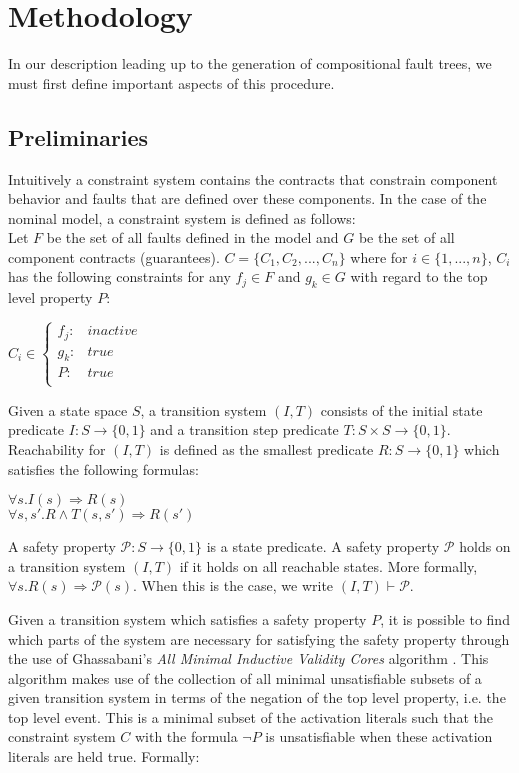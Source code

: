 \section{Methodology}
In our description leading up to the generation of compositional fault trees, we must first define important aspects of this procedure. 

\subsection{Preliminaries}
Intuitively a constraint system contains the contracts that constrain component behavior and faults that are defined over these components. In the case of the nominal model, a constraint system is defined as follows: \\

Let $F$ be the set of all faults defined in the model and $G$ be the set of all component contracts (guarantees). $C = \{C_1,C_2,...,C_n\}$ where for $i \in \{1,...,n\}$, $C_i$ has the following constraints for any $f_j \in F$ and $g_k \in G$ with regard to the top level property $P$: \\
\begin{center}
$C_i \in \left\{ \begin{array}{ll}
	f_j :&  inactive\\
	g_k :& true\\
	P :& true\\
\end{array}\right.$	
\end{center}

Given a state space $S$, a transition system $(I,T)$ consists of the initial state predicate $I : S \rightarrow \{0,1\}$ and a transition step predicate $T : S \times S \rightarrow \{0,1\}$. Reachability for $(I,T)$ is defined as the smallest predicate $R : S \rightarrow \{0,1\}$ which satisfies the following formulas:
\begin{center}
$\forall s. I(s) \Rightarrow R(s)$\\
$\forall s, s' .  R \land T(s,s') \Rightarrow R(s')$\\
\end{center}
A safety property $\mathcal{P} : S \to \{0,1\}$ is a state predicate. A safety property $\mathcal{P}$ holds on a transition system $(I,T)$ if it holds on all reachable states. More formally, $\forall s . R(s) \Rightarrow \mathcal{P}(s)$. When this is the case, we write $(I,T) \vdash\mathcal{P}$. 

Given a transition system which satisfies a safety property $P$, it is possible to find which parts of the system are necessary for satisfying the safety property through the use of Ghassabani's \textit{All Minimal Inductive Validity Cores} algorithm \cite{ghassabani2016efficient,ghassabani2017efficient}. This algorithm makes use of the collection of all minimal unsatisfiable subsets of a given transition system in terms of the negation of the top level property, i.e. the top level event. This is a minimal subset of the activation literals such that the constraint system $C$ with the formula $\neg P$ is unsatisfiable when these activation literals are held true. Formally: \\

